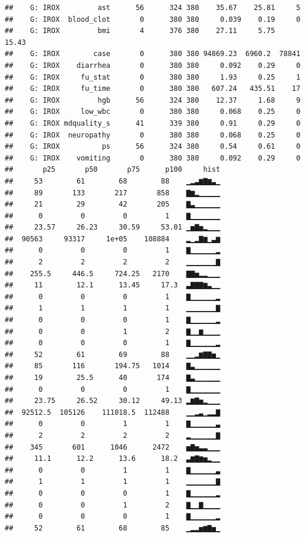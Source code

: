\documentclass[fleqn,10pt,lineno]{wlpeerj} %
\begin{document}
\begin{verbatim}
##    G: IROX         ast      56      324 380    35.67    25.81     5   
##    G: IROX  blood_clot       0      380 380     0.039    0.19     0   
##    G: IROX         bmi       4      376 380    27.11     5.75    15.43
##    G: IROX        case       0      380 380 94869.23  6960.2  78841   
##    G: IROX    diarrhea       0      380 380     0.092    0.29     0   
##    G: IROX     fu_stat       0      380 380     1.93     0.25     1   
##    G: IROX     fu_time       0      380 380   607.24   435.51    17   
##    G: IROX         hgb      56      324 380    12.37     1.68     9   
##    G: IROX     low_wbc       0      380 380     0.068    0.25     0   
##    G: IROX mdquality_s      41      339 380     0.91     0.29     0   
##    G: IROX  neuropathy       0      380 380     0.068    0.25     0   
##    G: IROX          ps      56      324 380     0.54     0.61     0   
##    G: IROX    vomiting       0      380 380     0.092    0.29     0   
##       p25       p50       p75      p100     hist
##     53        61        68        88    ▁▂▃▆▇▆▃▁
##     89       133       217       858    ▇▆▂▁▁▁▁▁
##     21        29        42       205    ▇▃▁▁▁▁▁▁
##      0         0         0         1    ▇▁▁▁▁▁▁▁
##     23.57     26.23     30.59     53.01 ▁▅▇▅▂▁▁▁
##  90563     93317     1e+05    108884    ▂▁▂▇▆▁▃▆
##      0         0         0         1    ▇▁▁▁▁▁▁▂
##      2         2         2         2    ▁▁▁▁▁▁▁▇
##    255.5     446.5     724.25   2170    ▇▇▅▂▂▁▁▁
##     11        12.1      13.45     17.3  ▃▇▇▇▆▃▁▁
##      0         0         0         1    ▇▁▁▁▁▁▁▂
##      1         1         1         1    ▁▁▁▁▁▁▁▇
##      0         0         0         1    ▇▁▁▁▁▁▁▂
##      0         0         1         2    ▇▁▁▆▁▁▁▁
##      0         0         0         1    ▇▁▁▁▁▁▁▂
##     52        61        69        88    ▁▁▂▆▇▇▅▁
##     85       116       194.75   1014    ▇▃▁▁▁▁▁▁
##     19        25.5      40       174    ▇▃▁▁▁▁▁▁
##      0         0         0         1    ▇▁▁▁▁▁▁▁
##     23.75     26.52     30.12     49.13 ▂▆▇▅▂▁▁▁
##  92512.5  105126    111018.5  112488    ▁▁▂▃▁▂▂▇
##      0         0         1         1    ▇▁▁▁▁▁▁▃
##      2         2         2         2    ▂▁▁▁▁▁▁▇
##    345       601      1046      2472    ▅▇▅▃▃▁▁▁
##     11.1      12.2      13.6      18.2  ▃▆▇▆▅▂▁▁
##      0         0         1         1    ▇▁▁▁▁▁▁▃
##      1         1         1         1    ▁▁▁▁▁▁▁▇
##      0         0         0         1    ▇▁▁▁▁▁▁▂
##      0         0         1         2    ▇▁▁▇▁▁▁▁
##      0         0         0         1    ▇▁▁▁▁▁▁▂
##     52        61        68        85    ▁▂▂▅▆▇▅▁

\end{verbatim}
\end{document}
